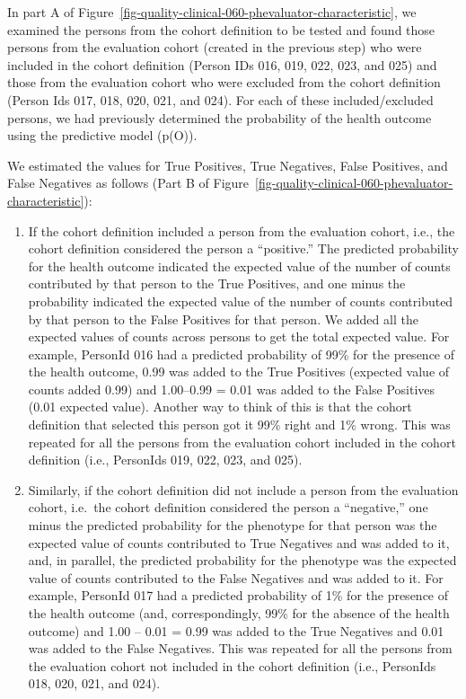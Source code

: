 \documentclass[
  letterpaper,
  paper=7in:10in,
  pagesize=pdftex,
  headinclude=on,
  footinclude=on,
  12pt]{scrbook}
\begin{document}
In part A of
Figure~\ref{fig-quality-clinical-060-phevaluator-characteristic}, we
examined the persons from the cohort definition to be tested and found
those persons from the evaluation cohort (created in the previous step)
who were included in the cohort definition (Person IDs 016, 019, 022,
023, and 025) and those from the evaluation cohort who were excluded
from the cohort definition (Person Ids 017, 018, 020, 021, and 024). For
each of these included/excluded persons, we had previously determined
the probability of the health outcome using the predictive model (p(O)).

We estimated the values for True Positives, True Negatives, False
Positives, and False Negatives as follows (Part B of
Figure~\ref{fig-quality-clinical-060-phevaluator-characteristic}):

\begin{enumerate}
\def\labelenumi{\arabic{enumi}.}
\item
  If the cohort definition included a person from the evaluation cohort,
  i.e., the cohort definition considered the person a ``positive.'' The
  predicted probability for the health outcome indicated the expected
  value of the number of counts contributed by that person to the True
  Positives, and one minus the probability indicated the expected value
  of the number of counts contributed by that person to the False
  Positives for that person. We added all the expected values of counts
  across persons to get the total expected value. For example, PersonId
  016 had a predicted probability of 99\% for the presence of the health
  outcome, 0.99 was added to the True Positives (expected value of
  counts added 0.99) and 1.00--0.99 = 0.01 was added to the False
  Positives (0.01 expected value). Another way to think of this is that
  the cohort definition that selected this person got it 99\% right and
  1\% wrong. This was repeated for all the persons from the evaluation
  cohort included in the cohort definition (i.e., PersonIds 019, 022,
  023, and 025).
\item
  Similarly, if the cohort definition did not include a person from the
  evaluation cohort, i.e.~the cohort definition considered the person a
  ``negative,'' one minus the predicted probability for the phenotype
  for that person was the expected value of counts contributed to True
  Negatives and was added to it, and, in parallel, the predicted
  probability for the phenotype was the expected value of counts
  contributed to the False Negatives and was added to it. For example,
  PersonId 017 had a predicted probability of 1\% for the presence of
  the health outcome (and, correspondingly, 99\% for the absence of the
  health outcome) and 1.00 -- 0.01 = 0.99 was added to the True
  Negatives and 0.01 was added to the False Negatives. This was repeated
  for all the persons from the evaluation cohort not included in the
  cohort definition (i.e., PersonIds 018, 020, 021, and 024).
\end{enumerate}
\end{document}
